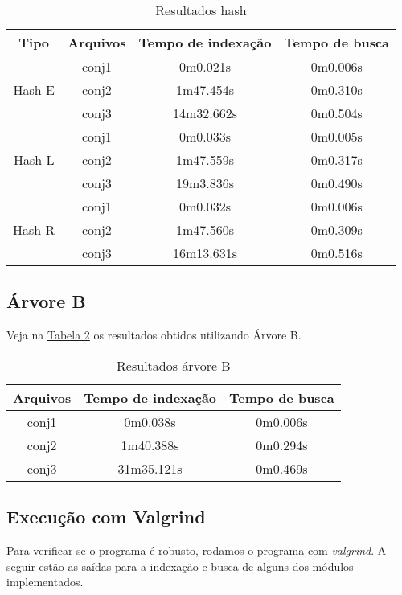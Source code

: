 \documentclass[
	11pt,				%
	oneside,			%
	a4paper,			%
	english,			%
	brazil,				%
	]{article}
\begin{document}
\hypertarget{t1}{}
\begin{table}[ht]
\centering
\begin{tabular}{cccc}
\hline 
\textbf{Tipo} & \textbf{Arquivos} & \textbf{Tempo de indexação} & \textbf{Tempo de busca} \\
\hline
\multirow{3}{*}{Hash E} &
conj1   & 0m0.021s   & 0m0.006s \\ 
& conj2 & 1m47.454s  & 0m0.310s \\ 
& conj3 & 14m32.662s & 0m0.504s \\ 
\hline
\multirow{3}{*}{Hash L} &
conj1   & 0m0.033s  & 0m0.005s \\ 
& conj2 & 1m47.559s & 0m0.317s \\ 
& conj3 & 19m3.836s & 0m0.490s \\ 
\hline
\multirow{3}{*}{Hash R} &
conj1   & 0m0.032s   & 0m0.006s \\ 
& conj2 & 1m47.560s  & 0m0.309s \\ 
& conj3 & 16m13.631s & 0m0.516s \\ 
\hline
\end{tabular}
\caption{Resultados hash}
\end{table}
\hypertarget{t1}{}

\subsection{Árvore B}
Veja na \hyperlink{t2}{Tabela 2} os resultados obtidos utilizando Árvore B.

\hypertarget{t2}{}
\begin{table}[ht]
\centering
\begin{tabular}{ccc}
\hline 
\textbf{Arquivos} & \textbf{Tempo de indexação} & \textbf{Tempo de busca} \\
\hline
conj1 & 0m0.038s   & 0m0.006s \\ 
conj2 & 1m40.388s  & 0m0.294s \\ 
conj3 & 31m35.121s & 0m0.469s \\ 
\hline 
\end{tabular}
\caption{Resultados árvore B}
\end{table}
\hypertarget{t2}{}

\subsection{Execução com Valgrind}
Para verificar se o programa é robusto, rodamos o programa com \textit{valgrind}. A seguir estão as saídas para a indexação e busca de alguns dos módulos implementados.
\end{document}
